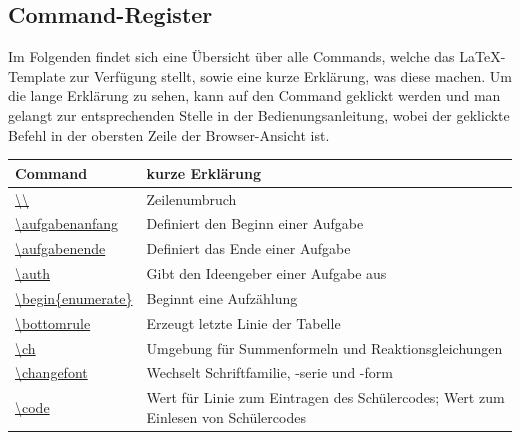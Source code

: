 \documentclass[../main.tex]{subfiles}
\begin{document}
\subsection{Command-Register}
Im Folgenden findet sich eine \"Ubersicht \"uber alle Commands, welche das \LaTeX -Template zur Verf\"ugung stellt, sowie eine kurze Erkl\"arung, was diese machen. Um die lange Erkl\"arung zu sehen, kann auf den Command geklickt werden und man gelangt zur entsprechenden Stelle in der Bedienungsanleitung, wobei der geklickte Befehl in der obersten Zeile der Browser-Ansicht ist. \\
\begin{tabularx}{\linewidth}{|l|X|}
\hline
Command&kurze Erkl\"arung\hfill\\\hline
    \hyperlink{textbackslash}{\textbackslash{}\textbackslash{}}&Zeilenumbruch\\\hline
    \hyperlink{aufgabenanfang}{\textbackslash{}aufgabenanfang}&Definiert den Beginn einer Aufgabe\\\hline
    \hyperlink{aufgabenende}{\textbackslash{}aufgabenende}&Definiert das Ende einer Aufgabe\\\hline
    \hyperlink{auth}{\textbackslash{}auth}&Gibt den Ideengeber einer Aufgabe aus\\\hline
    \hyperlink{beginenumerate}{\textbackslash{}begin\{enumerate\}}&Beginnt eine Aufz\"ahlung\\\hline
    \hyperlink{bottomrule}{\textbackslash{}bottomrule}&Erzeugt letzte Linie der Tabelle\\\hline
    \hyperlink{ch}{\textbackslash{}ch}&Umgebung f\"ur Summenformeln und Reaktionsgleichungen\\\hline
    \hyperlink{changefont}{\textbackslash{}changefont}&Wechselt Schriftfamilie, -serie und -form\\\hline
    \hyperlink{code}{\textbackslash{}code}&Wert \glqq 0\grqq{} f\"ur Linie zum Eintragen des Sch\"ulercodes; Wert \glqq 1\grqq{} zum Einlesen von Sch\"ulercodes\\\hline

\end{tabularx}
\end{document}
